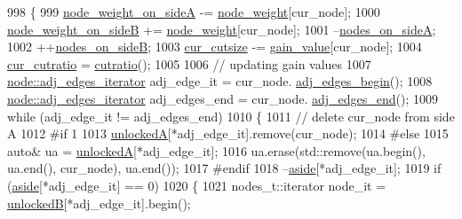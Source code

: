 \begin{DoxyCode}
998 \{
999     \mbox{\hyperlink{classratio__cut__partition_af1b839e48e498cf8ca93c8ec5df8a686}{node\_weight\_on\_sideA}} -= \mbox{\hyperlink{classratio__cut__partition_a4d9d2a9317a062f839ea7155c37b173f}{node\_weight}}[cur\_node];
1000     \mbox{\hyperlink{classratio__cut__partition_aa16d1b508db86eb0ba4824642394999a}{node\_weight\_on\_sideB}} += \mbox{\hyperlink{classratio__cut__partition_a4d9d2a9317a062f839ea7155c37b173f}{node\_weight}}[cur\_node];
1001     --\mbox{\hyperlink{classratio__cut__partition_a7de51193b63e241afe263345479580ee}{nodes\_on\_sideA}};
1002     ++\mbox{\hyperlink{classratio__cut__partition_a6b797912a7653537473e0e583a3f245a}{nodes\_on\_sideB}};
1003     \mbox{\hyperlink{classratio__cut__partition_aa01f2d6257fff28739e2431fe826ef71}{cur\_cutsize}} -= \mbox{\hyperlink{classratio__cut__partition_af24ff191abbb0578f0bfc54fef5f6d45}{gain\_value}}[cur\_node];
1004     \mbox{\hyperlink{classratio__cut__partition_a9dad324884cef5bcdd50122fc98e0860}{cur\_cutratio}} = \mbox{\hyperlink{classratio__cut__partition_a0adcba3c7847fcb62b607eebc334c503}{cutratio}}();
1005 
1006     \textcolor{comment}{// updating gain values}
1007     \mbox{\hyperlink{classnode_a12cb1a2167f5f03c054de5e707d3156f}{node::adj\_edges\_iterator}} adj\_edge\_it = cur\_node.
      \mbox{\hyperlink{classnode_a788d3e932a5c164caa5ec82aa47551b2}{adj\_edges\_begin}}();
1008     \mbox{\hyperlink{classnode_a12cb1a2167f5f03c054de5e707d3156f}{node::adj\_edges\_iterator}} adj\_edges\_end = cur\_node.
      \mbox{\hyperlink{classnode_aa1e7887d29390297580769454f769ad6}{adj\_edges\_end}}();
1009     \textcolor{keywordflow}{while} (adj\_edge\_it != adj\_edges\_end)
1010     \{
1011         \textcolor{comment}{// delete cur\_node from side A}
1012 \textcolor{preprocessor}{#if 1}
1013         \mbox{\hyperlink{classratio__cut__partition_a9e4d0ba86475bd0faa98e01c6be4dde0}{unlockedA}}[*adj\_edge\_it].remove(cur\_node);
1014 \textcolor{preprocessor}{#else}
1015         \textcolor{keyword}{auto}& ua = \mbox{\hyperlink{classratio__cut__partition_a9e4d0ba86475bd0faa98e01c6be4dde0}{unlockedA}}[*adj\_edge\_it];
1016         ua.erase(std::remove(ua.begin(), ua.end(), cur\_node), ua.end());
1017 \textcolor{preprocessor}{#endif}
1018         --\mbox{\hyperlink{classratio__cut__partition_a112bfcfb9d05d5bbdeb29576a61399e1}{aside}}[*adj\_edge\_it];
1019         \textcolor{keywordflow}{if} (\mbox{\hyperlink{classratio__cut__partition_a112bfcfb9d05d5bbdeb29576a61399e1}{aside}}[*adj\_edge\_it] == 0)
1020         \{
1021             nodes\_t::iterator node\_it = \mbox{\hyperlink{classratio__cut__partition_af7c877d8c6e9b533ab34cde1c6690b25}{unlockedB}}[*adj\_edge\_it].begin();

\end{DoxyCode}
